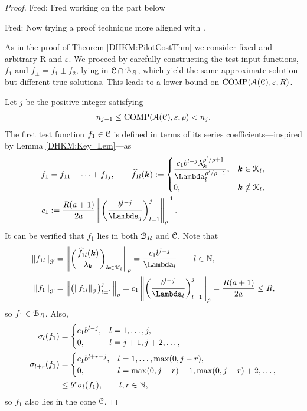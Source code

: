 \documentclass[USenglish]{article}
\theoremstyle{dgthm}
\theoremstyle{dgthm}
\theoremstyle{dgthm}
\theoremstyle{dgthm}
\theoremstyle{dgdef}
\DeclareMathOperator{\COMP}{COMP}
\newcommand{\hf}{\widehat{f}}
\newcommand{\norm}[2][{}]{\ensuremath{\left \lVert #2 \right \rVert}_{#1}}
\newcommand{\FredNote}[1]{{\color{blue}Fred: #1}}
\begin{document}
\begin{proof}
\FredNote{Fred working on the part below}

\FredNote{Now trying a proof technique more aligned with \cite{DinHic20a}.}

As in the proof of Theorem \ref{DHKM:PilotCostThm} we consider fixed and arbitrary R and $\varepsilon$.
We proceed by carefully constructing the test input functions, $f_1$ and $f_{\pm} = f_1 \pm f_2$, lying in ${\mathcal{C}} \cap {\mathcal{B}}_{R}$, which yield the same approximate solution but different true solutions.  This leads to a lower bound on $\COMP(\calA(\calC),\varepsilon,R)$. 

Let $j$ be the positive integer satisfying 
\[
n_{j-1} \le \COMP(\calA(\calC),\varepsilon,\rho) < n_j.
\]  
The first test function $f_1 \in {\mathcal{C}}$ is defined in terms of its series coefficients---inspired by Lemma \ref{DHKM:Key_Lem}---as
\begin{align}
\nonumber
f_1 &= f_{11} + \cdots + f_{1j}, \qquad
\hf_{1l}(\bsk) := \begin{cases}
\displaystyle
\frac{c_1 b^{l-j} \lambda_{\bsk}^{\rho'/\rho+1}}{\Lambda_l^{\rho'/\rho+1}},  & \bsk \in \calK_l,
\\
0, & \bsk \notin \calK_l,
\end{cases}
\\
\nonumber
c_1 &:=  \frac{R(a+1)}{2a} \norm[\rho]{ \biggl(\frac{b^{l-j}}{\Lambda_j} \biggr)_{l=1}^j }^{-1}.
\end{align}
It can be verified that $f_1$ lies in both ${\mathcal{B}}_{R}$ and ${\mathcal{C}}$.  Note that 
\begin{align}
\nonumber
\norm[\calF]{f_{1l}} &= \norm[\rho]{\biggl(\frac{\hf_{1l}(\bsk)}{\lambda_{\bsk}} \biggr)_{\bsk \in \calK_l}} 
= \frac{c_1 b^{l-j}}{\Lambda_l} \qquad l \in \N,\\
\nonumber
\norm[\calF]{f_1} &= \norm[\rho]{\bigl( \norm[\calF]{f_{1l}} \bigr)_{l=1}^{j} } 
=  c_1 \norm[\rho]{ \biggl(\frac{b^{l-j}}{\Lambda_l} \biggr)_{l=1}^{j} } = \frac{R(a+1)}{2a} \le R,
\end{align}
so $f_1 \in {\mathcal{B}}_R$.  Also,
\begin{align}
\nonumber
\sigma_l(f_1) &= \begin{cases}
c_1 b^{l-j}, & l=1, \ldots, j, \\
0, & l=j+1, j+2, \ldots,
\end{cases}
\\
\nonumber
\sigma_{l+r}(f_1) &= 
\begin{cases}
c_1 b^{l+r - j}, & l=1, \ldots, \max(0,j-r), \\
0, & l = \max(0,j-r)+1, \max(0,j-r) +2, \ldots, 
\end{cases}
\\
\nonumber 
& \leq b^r \sigma_l(f_1), \qquad l,r \in {\mathbb{N}},
\end{align}
so $f_1$ also lies in the cone ${\mathcal{C}}$.




\end{proof}
\end{document}
